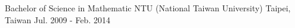 

\begin{cventries}

  \cventry
  {Bachelor of Science in Mathematic} %
  {NTU (National Taiwan University)} %
  {Taipei, Taiwan} %
  {Jul. 2009 - Feb. 2014} %
  {
  }

\end{cventries}
